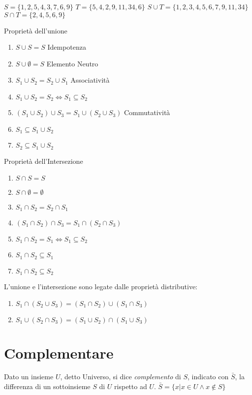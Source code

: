 $S = \{1,2,5,4,3,7,6,9\}$
$T = \{5,4,2,9,11,34,6\}$
$S \cup T = \{1,2,3,4,5,6,7,9,11,34\}$
$S \cap T = \{2,4,5,6,9\}$

Proprietà dell'unione
\begin{enumerate}
\item $S \cup S = S$ \quad Idempotenza
\item $S \cup \emptyset = S$ \quad Elemento Neutro
\item $S_1 \cup S_2 = S_2 \cup S_1$ \quad Associatività
\item $S_1 \cup S_2 = S_2 \iff S_1 \subseteq S_2$
\item $(S_1 \cup S_2) \cup S_3 = S_1 \cup (S_2 \cup S_3)$ \quad Commutatività
\item $S_1 \subseteq S_1 \cup S_2$
\item $S_2 \subseteq S_1 \cup S_2$
\end{enumerate}


Proprietà dell'Intersezione
\begin{enumerate}
  \item $S \cap S = S$
  \item $S \cap \emptyset = \emptyset$
  \item $S_1 \cap S_2 = S_2 \cap S_1$
  \item $(S_1 \cap S_2) \cap S_3 = S_1 \cap (S_2 \cap S_3)$
  \item $S_1 \cap S_2 = S_1 \iff S_1 \subseteq S_2$
  \item $S_1 \cap S_2 \subseteq S_1$
  \item $S_1 \cap S_2 \subseteq S_2$
\end{enumerate}

L'unione e l'intersezione sono legate dalle proprietà distributive:

\begin{enumerate}
  \item $S_1 \cap (S_2 \cup S_3) = (S_1 \cap S_2) \cup (S_1 \cap S_3)$
  \item $S_1 \cup (S_2 \cap S_3) = (S_1 \cup S_2) \cap (S_1 \cup S_3)$
\end{enumerate}

\section{Complementare}
Dato un insieme $U$, detto Universo, si dice \textit{complemento} di $S$, indicato con $\bar{S}$,
la differenza di un sottoinsieme $S$ di $U$ rispetto ad $U$.\newline
$\bar{S} = \{x | x \in U \land x \not \in S \} $

